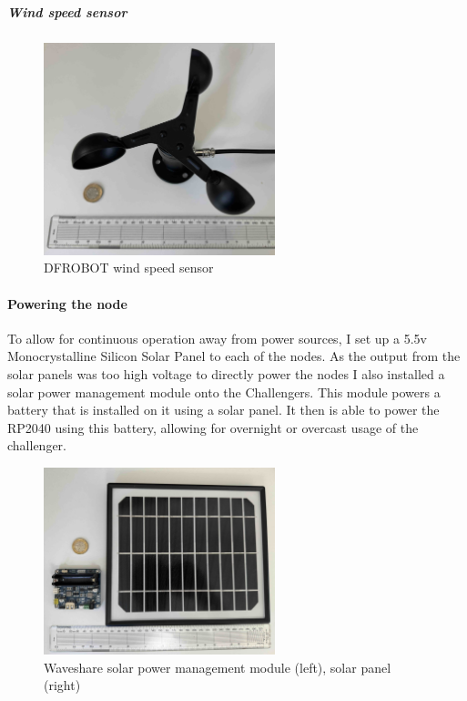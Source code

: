 \subparagraph{Wind speed sensor}

\begin{figure}[H]
    \centering
    \includegraphics[width=0.6\textwidth]{contents/part-2/fig2/wind-sensor.jpg}
    \caption{DFROBOT wind speed sensor}
    \label{fig:wind-sensor}
\end{figure}

\paragraph{Powering the node}

To allow for continuous operation away from power sources, I set up a 5.5v
Monocrystalline Silicon Solar Panel to each of the nodes. As the output from the
solar panels was too high voltage to directly power the nodes I also installed a
solar power management module onto the Challengers. This module powers a battery
that is installed on it using a solar panel. It then is able to power the RP2040
using this battery, allowing for overnight or overcast usage of the challenger.

\begin{figure}[H]
    \centering
    \includegraphics[width=0.6\textwidth]{contents/part-2/fig2/solar-panel-manager.jpg}
    \caption{Waveshare solar power management module (left), solar panel (right)}
    \label{fig:solar-module}
\end{figure}

